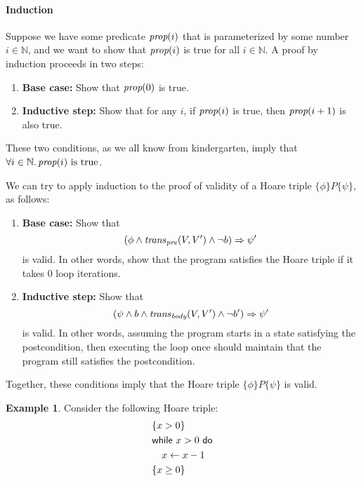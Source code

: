 \documentclass{amsart}
\theoremstyle{definition}
\newtheorem{example}[theorem]{Example}
\theoremstyle{remark}
\numberwithin{equation}{section}
\begin{document}
\paragraph{Induction}
Suppose we have some predicate $\emph{prop}(i)$
that is parameterized by some number $i \in \mathbb{N}$,
and we want to show that $\emph{prop}(i)$ is true
for all $i \in \mathbb{N}$.
A proof by induction proceeds in two steps:
\begin{enumerate}
  \item \textbf{Base case:}
  Show that $\emph{prop}(0)$ is true.

  \item \textbf{Inductive step:}
  Show that for any $i$,
  if $\emph{prop}(i)$ is true, then $\emph{prop}(i+1)$
  is also true.
\end{enumerate}
These two conditions, as we all know from kindergarten,
imply that $\forall i \in \mathbb{N} \ldotp \emph{prop}(i) \text{ is true}$.

We can try to apply induction to the proof
of validity of a Hoare triple $\{\phi\} P \{\psi\}$,
as follows:
\begin{enumerate}
  \item \textbf{Base case:}
  Show that
  $$(\phi \land \mathit{trans}_{\emph{pre}}(V,V') \land \neg b) \Rightarrow \psi'$$
  is valid.
  In other words, show that the program satisfies
  the Hoare triple if it takes 0 loop iterations.

  \item \textbf{Inductive step:}
  Show that
  $$(\psi \land b \land \mathit{trans}_{\emph{body}}(V,V') \land \neg b')
  \Rightarrow \psi'$$
  is valid.
  In other words, assuming the program starts
  in a state satisfying the postcondition,
  then executing the loop once should maintain
  that the program still satisfies the postcondition.
\end{enumerate}
Together, these conditions imply that
the Hoare triple $\{\phi\} P \{\psi\}$
is valid.

\begin{example}
  Consider the following Hoare triple:
  \begin{align*}
    &\{x > 0\} \\
    &\mathsf{while} ~ x > 0  ~ \mathsf{do}\\
    &\ \ \ x \gets x - 1\\
    &\{x \geq 0\}
  \end{align*}
\end{example}
\end{document}
